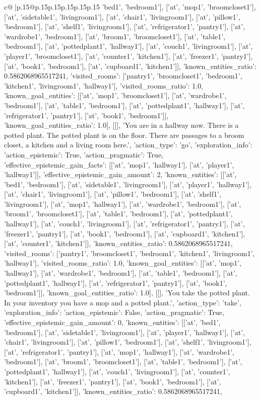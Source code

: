 \documentclass{article}
\begin{document}
{\begin{supertabular}{c@{$\;$}|p{.15\linewidth}@{}p{.15\linewidth}p{.15\linewidth}p{.15\linewidth}p{.15\linewidth}p{.15\linewidth}}
{{{'bed1', 'bedroom1'], ['at', 'mop1', 'broomcloset1'], ['at', 'sidetable1', 'livingroom1'], ['at', 'chair1', 'livingroom1'], ['at', 'pillow1', 'bedroom1'], ['at', 'shelf1', 'livingroom1'], ['at', 'refrigerator1', 'pantry1'], ['at', 'wardrobe1', 'bedroom1'], ['at', 'broom1', 'broomcloset1'], ['at', 'table1', 'bedroom1'], ['at', 'pottedplant1', 'hallway1'], ['at', 'couch1', 'livingroom1'], ['at', 'player1', 'broomcloset1'], ['at', 'counter1', 'kitchen1'], ['at', 'freezer1', 'pantry1'], ['at', 'book1', 'bedroom1'], ['at', 'cupboard1', 'kitchen1']], 'known_entities_ratio': 0.5862068965517241, 'visited_rooms': ['pantry1', 'broomcloset1', 'bedroom1', 'kitchen1', 'livingroom1', 'hallway1'], 'visited_rooms_ratio': 1.0, 'known_goal_entities': [['at', 'mop1', 'broomcloset1'], ['at', 'wardrobe1', 'bedroom1'], ['at', 'table1', 'bedroom1'], ['at', 'pottedplant1', 'hallway1'], ['at', 'refrigerator1', 'pantry1'], ['at', 'book1', 'bedroom1']], 'known_goal_entities_ratio': 1.0}}], [[], 'You are in a hallway now. There is a potted plant. The potted plant is on the floor. There are passages to a broom closet, a kitchen and a living room here.', {'action_type': 'go', 'exploration_info': {'action_epistemic': True, 'action_pragmatic': True, 'effective_epistemic_gain_facts': [['at', 'mop1', 'hallway1'], ['at', 'player1', 'hallway1']], 'effective_epistemic_gain_amount': 2, 'known_entities': [['at', 'bed1', 'bedroom1'], ['at', 'sidetable1', 'livingroom1'], ['at', 'player1', 'hallway1'], ['at', 'chair1', 'livingroom1'], ['at', 'pillow1', 'bedroom1'], ['at', 'shelf1', 'livingroom1'], ['at', 'mop1', 'hallway1'], ['at', 'wardrobe1', 'bedroom1'], ['at', 'broom1', 'broomcloset1'], ['at', 'table1', 'bedroom1'], ['at', 'pottedplant1', 'hallway1'], ['at', 'couch1', 'livingroom1'], ['at', 'refrigerator1', 'pantry1'], ['at', 'freezer1', 'pantry1'], ['at', 'book1', 'bedroom1'], ['at', 'cupboard1', 'kitchen1'], ['at', 'counter1', 'kitchen1']], 'known_entities_ratio': 0.5862068965517241, 'visited_rooms': ['pantry1', 'broomcloset1', 'bedroom1', 'kitchen1', 'livingroom1', 'hallway1'], 'visited_rooms_ratio': 1.0, 'known_goal_entities': [['at', 'mop1', 'hallway1'], ['at', 'wardrobe1', 'bedroom1'], ['at', 'table1', 'bedroom1'], ['at', 'pottedplant1', 'hallway1'], ['at', 'refrigerator1', 'pantry1'], ['at', 'book1', 'bedroom1']], 'known_goal_entities_ratio': 1.0}}], [[], 'You take the potted plant. In your inventory you have a mop and a potted plant.', {'action_type': 'take', 'exploration_info': {'action_epistemic': False, 'action_pragmatic': True, 'effective_epistemic_gain_amount': 0, 'known_entities': [['at', 'bed1', 'bedroom1'], ['at', 'sidetable1', 'livingroom1'], ['at', 'player1', 'hallway1'], ['at', 'chair1', 'livingroom1'], ['at', 'pillow1', 'bedroom1'], ['at', 'shelf1', 'livingroom1'], ['at', 'refrigerator1', 'pantry1'], ['at', 'mop1', 'hallway1'], ['at', 'wardrobe1', 'bedroom1'], ['at', 'broom1', 'broomcloset1'], ['at', 'table1', 'bedroom1'], ['at', 'pottedplant1', 'hallway1'], ['at', 'couch1', 'livingroom1'], ['at', 'counter1', 'kitchen1'], ['at', 'freezer1', 'pantry1'], ['at', 'book1', 'bedroom1'], ['at', 'cupboard1', 'kitchen1']], 'known_entities_ratio': 0.5862068965517241, }}}
\end{supertabular}}
\end{document}
